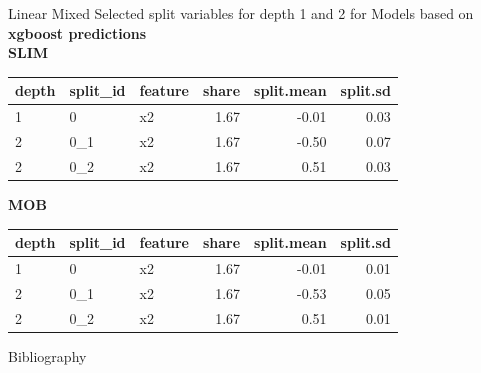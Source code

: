 \documentclass[9pt, xcolor=table]{beamer}
\begin{document}
\begin{frame}{Linear Mixed}
Selected split variables for depth 1 and 2 for Models based on \textbf{xgboost predictions}\\
\textbf{SLIM}

\begin{table}[ht]
\centering
\begin{tabular}{lllrrr}
  \hline
depth & split\_id & feature & share & split.mean & split.sd \\ 
  \hline
1 & 0 & x2 & 1.67 & -0.01 & 0.03 \\ 
  2 & 0\_1 & x2 & 1.67 & -0.50 & 0.07 \\ 
  2 & 0\_2 & x2 & 1.67 & 0.51 & 0.03 \\ 
   \hline
\end{tabular}
\end{table}

\textbf{MOB}
\begin{table}[ht]
\centering
\begin{tabular}{lllrrr}
  \hline
depth & split\_id & feature & share & split.mean & split.sd \\ 
  \hline
1 & 0 & x2 & 1.67 & -0.01 & 0.01 \\ 
  2 & 0\_1 & x2 & 1.67 & -0.53 & 0.05 \\ 
  2 & 0\_2 & x2 & 1.67 & 0.51 & 0.01 \\ 
   \hline
\end{tabular}
\end{table}
\end{frame}


\begin{frame}{Bibliography}
    
    

\end{frame}
\end{document}

